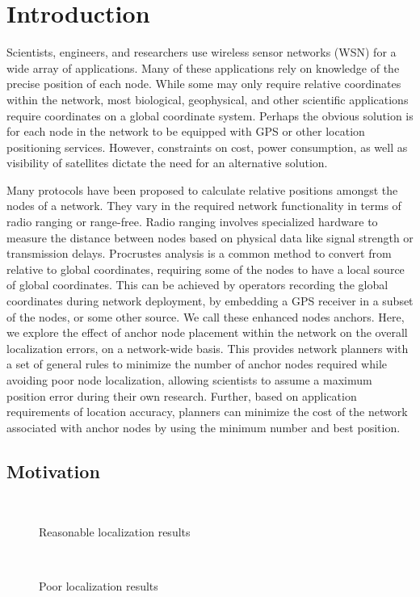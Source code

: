 
\chapter{Introduction}

Scientists, engineers, and researchers use wireless sensor networks (WSN) for a wide array of applications. Many of these applications rely on knowledge of the precise position of each node. While some may only require relative coordinates within the network, most biological, geophysical, and other scientific applications require coordinates on a global coordinate system. Perhaps the obvious solution is for each node in the network to be equipped with GPS or other location positioning services.  However, constraints on cost, power consumption, as well as visibility of satellites dictate the need for an alternative solution.  

Many protocols have been proposed\cite{APS,MDS-MAP,CCA-MAP07} to calculate relative positions amongst the nodes of a network.  They vary in the required network functionality in terms of radio ranging or range-free.  Radio ranging involves specialized hardware to measure the distance between nodes based on physical data like signal strength or transmission delays.  Procrustes analysis\cite{procrustes-matlab} is a common method to convert from relative to global coordinates, requiring some of the nodes to have a local source of global coordinates.  This can be achieved by operators recording the global coordinates during network deployment, by embedding a GPS receiver in a subset of the nodes, or some other source.  We call these enhanced nodes anchors.  Here, we explore the effect of anchor node placement within the network on the overall localization errors, on a network-wide basis. This provides network planners with a set of general rules to minimize the number of anchor nodes required while avoiding poor node localization, allowing scientists to assume a maximum position error during their own research.  Further, based on application requirements of location accuracy, planners can minimize the cost of the network associated with anchor nodes by using the minimum number and best position.

\section{Motivation}
\begin{figure}
  \centering
    \\
	\caption{Reasonable localization results}
    \label{fig:Motivation1}    
\end{figure}
\begin{figure}
  \centering
	\\
    \caption{Poor localization results}
    \label{fig:Motivation2}
\end{figure}

